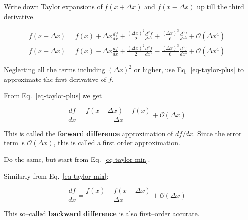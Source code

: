 \begin{cue}
\noindent{}Write down Taylor expansions of $f(x+\Delta x)$ and $f(x-\Delta x)$ up till the third derivative. 
\end{cue}

\begin{gather}
f(x+\Delta x) = f(x) + \Delta x \frac{d f}{d x} + \frac{{(\Delta x)}^2}{2} \frac{d^2 f}{d x^2} + \frac{{(\Delta x)}^3}{6} \frac{d^3 f}{d x^3} + \mathcal{O}\left(\Delta x^4\right) \label{eq-taylor-plus} \\
f(x-\Delta x) = f(x) - \Delta x \frac{d f}{d x} + \frac{{(\Delta x)}^2}{2} \frac{d^2 f}{d x^2} - \frac{{(\Delta x)}^3}{6} \frac{d^3 f}{d x^3} + \mathcal{O}\left(\Delta x^4\right) \label{eq-taylor-min}
\end{gather} 

\begin{cue}
Neglecting all the terms including $\left(\Delta x\right)^2$ or higher, use Eq.~\ref{eq-taylor-plus} to approximate the first derivative of $f$.
\end{cue}

From Eq.~\ref{eq-taylor-plus} we get

\begin{equation}
\frac{d f}{d x} = \frac{f(x+\Delta x) - f(x)}{\Delta x} + \mathcal{O}\left(\Delta x\right)
\end{equation} 

This is called the \textbf{forward difference} approximation of $df / dx$. Since the error term is $\mathcal{O}(\Delta x)$, this is called a first order approximation.

\begin{cue}
Do the same, but start from Eq.~\ref{eq-taylor-min}.
\end{cue}

Similarly from Eq.~\ref{eq-taylor-min}:

\begin{equation}
\frac{d f}{d x} = \frac{f(x) - f(x- \Delta x)}{\Delta x} + \mathcal{O}\left(\Delta x\right)
\end{equation} 

This so--called \textbf{backward difference} is also first--order accurate.

